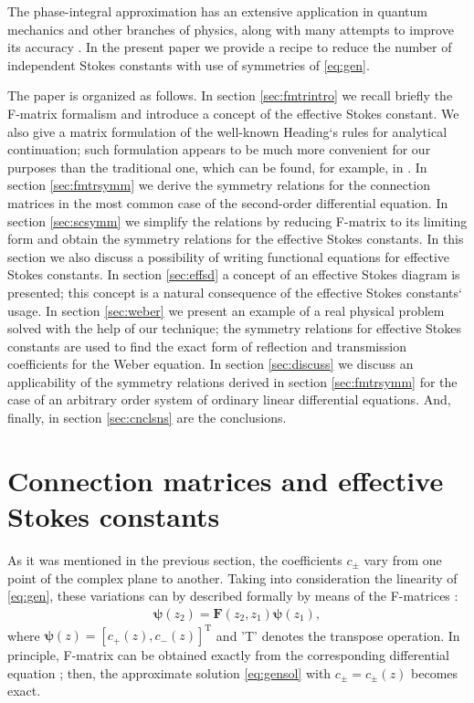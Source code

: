 \documentclass[atmp]{ipart_v1}
\def\psii{\bm\psi}
\def\F{\bm{F}}
\def\T{\mathrm{T}}
\newcommand\eref[1]{\eqref{#1}}
\newcommand\sref[1]{section \ref{#1}}
\begin{document}
The phase-integral approximation has an extensive application in quantum mechanics and other 
branches of physics, along with many attempts to improve its accuracy
\cite{ours,dunham,dingle73,berry90,berry91,sergeenko96,delabaere97,sergeenko02,mirnov10,poor16,esposito09,aleixo00}. 
In the present paper we provide a recipe to reduce the number 
of independent Stokes constants with use of symmetries of \eref{eq:gen}. 

The paper is organized as follows. 
In \sref{sec:fmtrintro} we recall briefly the F-matrix formalism and introduce a concept of the 
effective Stokes constant. We also give a matrix formulation of the well-known Heading`s rules for
analytical continuation; such formulation appears to be much more convenient for our purposes than 
the traditional one, which can be found, for example, in \cite{rwbook}.
In \sref{sec:fmtrsymm} we derive the symmetry relations for the connection matrices in the most common 
case of the second-order differential equation.
In \sref{sec:scsymm} we simplify the relations by reducing F-matrix to its limiting form and
obtain the symmetry relations for the effective Stokes constants. In this section we also discuss
a possibility of writing functional equations for effective Stokes constants.
In \sref{sec:effsd} a concept of an effective Stokes diagram is presented; this concept is a natural
consequence of the effective Stokes constants` usage.
In \sref{sec:weber} we present an example of a real physical problem solved with the help of our technique; 
the symmetry relations for effective Stokes constants are used to find the exact 
form of reflection and transmission coefficients for the Weber equation. 
In \sref{sec:discuss} we discuss an applicability of the symmetry relations derived in \sref{sec:fmtrsymm}
for the case of an arbitrary order system of ordinary linear differential equations.
And, finally, in \sref{sec:cnclsns} are the conclusions. 













\section{Connection matrices and effective Stokes constants \label{sec:fmtrintro}}
As it was mentioned in the previous section, the coefficients $c_\pm$ 
vary from one point of the complex plane to another. Taking into consideration
the linearity of \eref{eq:gen}, these variations can by described formally by means 
of the F-matrices \cite{frbook}:
\begin{eqnarray}
\psii(z_2) = \F(z_2,z_1) \psii(z_1),
\label{eq:fmtrdef}
\end{eqnarray}
where $\psii(z) = [{c_+(z),c_-(z)}]^{\T}$ and 'T' denotes the transpose operation.
In principle, F-matrix can be obtained exactly from the corresponding differential 
equation \cite{frbook}; then, the approximate solution \eref{eq:gensol} 
with $c_\pm=c_\pm(z)$ becomes exact.  
\end{document}
